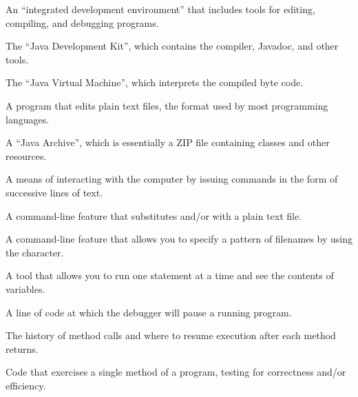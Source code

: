 \begin{description}

An ``integrated development environment'' that includes tools for editing, compiling, and debugging programs.

The ``Java Development Kit'', which contains the compiler, Javadoc, and other tools.

The ``Java Virtual Machine'', which interprets the compiled byte code.

A program that edits plain text files, the format used by most programming languages.

A ``Java Archive'', which is essentially a ZIP file containing classes and other resources.

A means of interacting with the computer by issuing commands in the form of successive lines of text.

A command-line feature that substitutes  and/or  with a plain text file.

A command-line feature that allows you to specify a pattern of filenames by using the {\tt *} character.

A tool that allows you to run one statement at a time and see the contents of variables.

A line of code at which the debugger will pause a running program.

The history of method calls and where to resume execution after each method returns.

Code that exercises a single method of a program, testing for correctness and/or efficiency.

\end{description}
